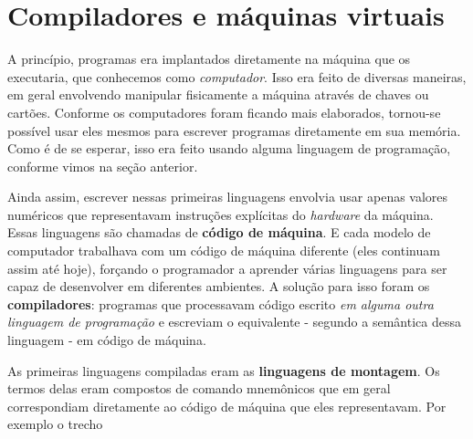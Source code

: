   \section{Compiladores e máquinas virtuais}
  \label{cap:conceitos:compiladores}


    A princípio, programas era implantados diretamente na máquina que os
    executaria, que conhecemos como \emph{computador}. Isso era feito de diversas
    maneiras, em geral envolvendo manipular fisicamente a máquina através de
    chaves ou cartões. Conforme os computadores foram ficando mais elaborados,
    tornou-se possível usar eles mesmos para escrever programas diretamente em
    sua memória. Como é de se esperar, isso era feito usando alguma linguagem
    de programação, conforme vimos na seção anterior.

    Ainda assim, escrever nessas primeiras linguagens envolvia usar apenas valores
    numéricos que representavam instruções explícitas do \emph{hardware} da
    máquina. Essas linguagens são chamadas de \textbf{código de máquina}. E cada
    modelo de computador trabalhava com um código de máquina diferente (eles
    continuam assim até hoje), forçando o programador a aprender várias linguagens
    para ser capaz de desenvolver em diferentes ambientes. A solução para isso
    foram os \textbf{compiladores}: programas que processavam código escrito
    \emph{em alguma outra linguagem de programação} e escreviam o equivalente -
    segundo a semântica dessa linguagem - em código de máquina.


    As primeiras linguagens compiladas eram as \textbf{linguagens de montagem}. Os
    termos delas eram compostos de comando mnemônicos que em geral correspondiam
    diretamente ao código de máquina que eles representavam. Por exemplo o trecho

